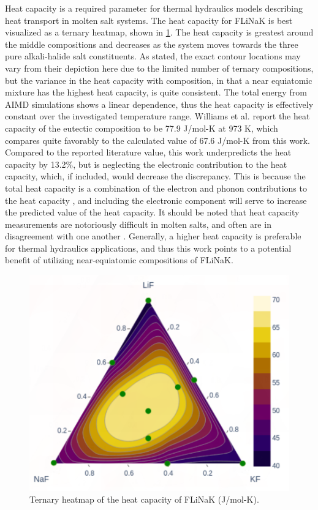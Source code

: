 \documentclass[preprint,12pt]{elsarticle}
\begin{document}
Heat capacity is a required parameter for thermal hydraulics models describing heat transport in molten salt systems\cite{freile2019}. The heat capacity for FLiNaK is best visualized as a ternary heatmap, shown in \cref{fig:Cp}. The heat capacity is greatest around the middle compositions and decreases as the system moves towards the three pure alkali-halide salt constituents. As stated, the exact contour locations may vary from their depiction here due to the limited number of ternary compositions, but the variance in the heat capacity with composition, in that a near equiatomic mixture has the highest heat capacity, is quite consistent. The total energy from AIMD simulations shows a linear dependence, thus the heat capacity is effectively constant over the investigated temperature range. Williams et al. report the heat capacity of the eutectic composition to be 77.9 J/mol-K at 973 K\cite{williams2006Cp}, which compares quite favorably to the calculated value of 67.6 J/mol-K from this work. Compared to the reported literature value, this work underpredicts the heat capacity by 13.2\%, but is neglecting the electronic contribution to the heat capacity, which, if included, would decrease the discrepancy. This is because the total heat capacity is a combination of the electron and phonon contributions to the heat capacity \cite{moore_uzr}, and including the electronic component will serve to increase the predicted value of the heat capacity. It should be noted that heat capacity measurements are notoriously difficult in molten salts, and often are in disagreement with one another \cite{robertson2022}. Generally, a higher heat capacity is preferable for thermal hydraulics applications, and thus this work points to a potential benefit of utilizing near-equiatomic compositions of FLiNaK. 

\begin{figure}[!ht]
    \centering
    \includegraphics[width=.7\textwidth]{heatCapacity_withScatter.png}
    \caption{Ternary heatmap of the heat capacity of FLiNaK (J/mol-K).}
    \label{fig:Cp}
\end{figure}
\end{document}
